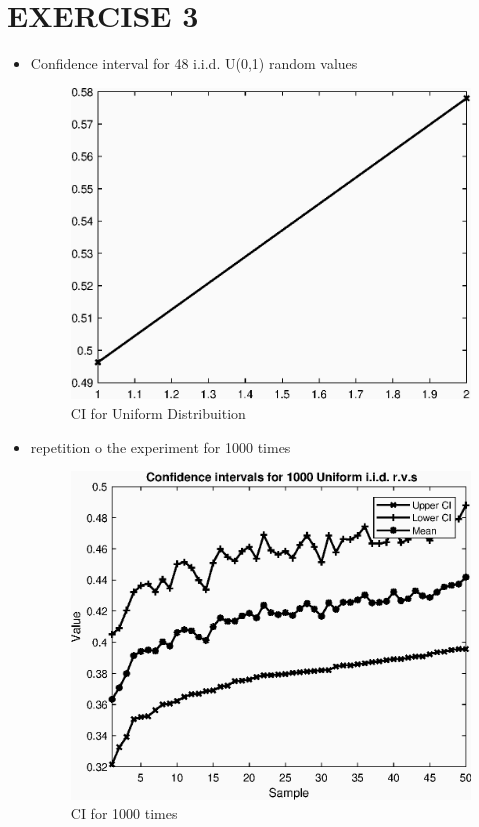 \documentclass[a4paper, 12pt]{article}
\begin{document}
\section*{EXERCISE 3}
\begin{itemize}
	\item Confidence interval for 48 i.i.d. U(0,1) random values
	\begin{figure}[h!]
		\centering
		\includegraphics{CIUniformDist}
		\caption*{CI for Uniform Distribuition}
	\end{figure} 

	\item repetition o the experiment for 1000 times 
	\begin{figure}[h!]
		\centering
		\includegraphics{CIUniformDistFor1000Times}
		\caption*{CI for 1000 times}
	\end{figure} 	
\end{itemize}
\end{document}
